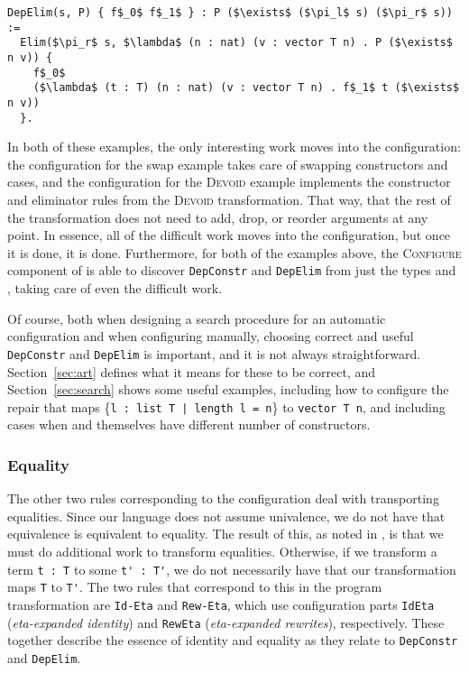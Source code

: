 \begin{lstlisting}
DepElim(s, P) { f$_0$ f$_1$ } : P ($\exists$ ($\pi_l$ s) ($\pi_r$ s)) :=
  Elim($\pi_r$ s, $\lambda$ (n : nat) (v : vector T n) . P ($\exists$ n v)) {
    f$_0$
    ($\lambda$ (t : T) (n : nat) (v : vector T n) . f$_1$ t ($\exists$ n v))
  }. 
\end{lstlisting}

In both of these examples, the only interesting work moves into the configuration:
the configuration for the swap example takes care of swapping constructors and cases,
and the configuration for the \textsc{Devoid} example implements the constructor and eliminator rules from the \textsc{Devoid} transformation.
That way, that the rest of the \toolname transformation does not need to add, drop, or reorder arguments at any point.
In essence, all of the difficult work moves into the configuration, but once it is done, it is done.
Furthermore, for both of the examples above, the \textsc{Configure} component of \toolname is able to discover \lstinline{DepConstr}
and \lstinline{DepElim} from just the types \A and \B, taking care of even the difficult work.

Of course, both when designing a search procedure for an automatic configuration and when
configuring \toolname manually, choosing correct and useful \lstinline{DepConstr} and \lstinline{DepElim} is important,
and it is not always straightforward.
Section~\ref{sec:art} defines what it means for these to be correct,
and Section~\ref{sec:search} shows some useful examples, including
how to configure the repair that maps \{\lstinline{l : list T | length l = n}\} to \lstinline{vector T n},
and including cases when \A and \B themselves have different number of constructors.

\subsubsection{Equality}
\label{sec:equality}

The other two rules corresponding to the configuration deal with transporting equalities.
Since our language does not assume univalence, we do not have that equivalence is equivalent to equality.
The result of this, as noted in \citet{tabareau2019marriage},
is that we must do additional work to transform equalities.
Otherwise, if we transform a term \lstinline{t : T} to some \lstinline{t' : T'}, we do not necessarily
have that our transformation maps \lstinline{T} to \lstinline{T'}.
The two rules that correspond to this in the program transformation are \lstinline{Id-Eta} and \lstinline{Rew-Eta},
which use configuration parts \lstinline{IdEta} (\textit{eta-expanded identity}) and \lstinline{RewEta} (\textit{eta-expanded rewrites}), respectively.
These together describe the essence of identity and equality as they relate to \lstinline{DepConstr}
and \lstinline{DepElim}.

